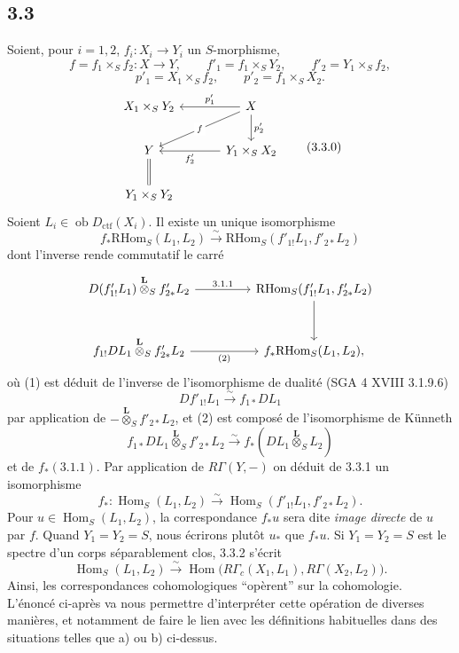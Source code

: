 \documentclass[11pt]{article}
\DeclareMathOperator{\Hom}{Hom}
\newcommand{\ob}{\operatorname{ob}}
\providecommand{\RHom}{\mathrm{RHom}}
\providecommand{\Dctf}{D_{\mathrm{ctf}}}
\providecommand{\Dctf}{D_{\mathrm{ctf}}}
\providecommand{\RHom}{\mathrm{RHom}}
\providecommand{\Hom}{\operatorname{Hom}}
\providecommand{\ob}{\operatorname{ob}}
\providecommand{\RHom}{\mathrm R\mathcal{H}om}
\providecommand{\RHom}{\mathrm{RHom}}
\providecommand{\Hom}{\operatorname{Hom}}
\begin{document}
\subsection*{3.3}
Soient, pour $i=1,2$, $f_i:X_i\to Y_i$ un $S$-morphisme,
\[
f=f_1\times_S f_2:X\to Y,
\qquad
f'_1=f_1\times_S Y_2,
\qquad
f'_2=Y_1\times_S f_2,
\]
\[
p'_1=X_1\times_S f_2,
\qquad
p'_2=f_1\times_S X_2.
\]
\begin{equation}
\begin{tikzcd}[column sep=3.3em,row sep=2.0em]
X_1\times_S Y_2 & X \arrow[l,"p'_1"'] \arrow[dl,"f" description] \arrow[d,"p'_2"] \\
Y & Y_1\times_S X_2 \arrow[l,"f'_2"] \\
Y_1\times_S Y_2 \arrow[u,equal] &
\end{tikzcd}
\tag{3.3.0}
\end{equation}
Soient $L_i\in\ob\Dctf(X_i)$. Il existe un unique isomorphisme
\begin{equation}
f_*\RHom_S(L_1,L_2)
\xrightarrow{\sim}
\RHom_S(f'_{1!}L_1,f'_{2*}L_2)
\tag{3.3.1}
\end{equation}
dont l'inverse rende commutatif le carré
\[
\begin{tikzcd}[column sep=4.5em,row sep=2.6em]
D(f'_{1!}L_1)\overset{\mathbf L}{\otimes}_S f'_{2*}L_2
  \arrow[r,"3.1.1"] 
& \RHom_S(f'_{1!}L_1,f'_{2*}L_2) \arrow[d] \\
f_{1!}DL_1\overset{\mathbf L}{\otimes}_S f'_{2*}L_2
  \arrow[r,"(2)"']
& f_*\RHom_S(L_1,L_2),
\end{tikzcd}
\]
où (1) est déduit de l'inverse de l'isomorphisme de dualité (SGA 4 XVIII 3.1.9.6)
\[
Df'_{1!}L_1\xrightarrow{\sim}f_{1*}DL_1
\]
par application de $-\overset{\mathbf L}{\otimes}_S f'_{2*}L_2$, et (2) est composé de l'isomorphisme de Künneth
\[
f_{1*}DL_1\overset{\mathbf L}{\otimes}_S f'_{2*}L_2
\xrightarrow{\sim}
f_*(DL_1\overset{\mathbf L}{\otimes}_S L_2)
\]
et de $f_*(3.1.1)$. Par application de $R\Gamma(Y,-)$ on déduit de 3.3.1 un isomorphisme
\begin{equation}
f_*:\Hom_S(L_1,L_2)
\xrightarrow{\sim}
\Hom_S(f'_{1!}L_1,f'_{2*}L_2).
\tag{3.3.2}
\end{equation}
Pour $u\in\Hom_S(L_1,L_2)$, la correspondance $f_*u$ sera dite \emph{image directe} de $u$ par $f$. Quand $Y_1=Y_2=S$, nous écrirons plutôt $u_*$ que $f_*u$. Si $Y_1=Y_2=S$ est le spectre d'un corps séparablement clos, 3.3.2 s'écrit
\begin{equation}
\Hom_S(L_1,L_2)
\xrightarrow{\sim}
\Hom\bigl(R\Gamma_c(X_1,L_1),R\Gamma(X_2,L_2)\bigr).
\tag{3.3.3}
\end{equation}
Ainsi, les correspondances cohomologiques ``opèrent'' sur la cohomologie. L'énoncé ci-après va nous permettre d'interpréter cette opération de diverses manières, et notamment de faire le lien avec les définitions habituelles dans des situations telles que a) ou b) ci-dessus.
\end{document}
